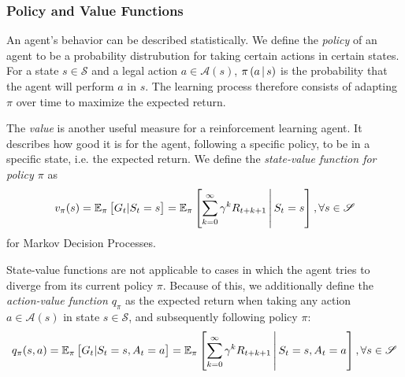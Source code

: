 \subsubsection{Policy and Value Functions}
An agent's behavior can be described statistically. We define the \textit{policy} of an agent to be a probability distrubution for taking certain actions in certain states. For a state $s \in \mathscr{S}$ and a legal action $a \in \mathscr{A}(s)$, $\pi\left(a \,\middle|\, s\right)$ is the probability that the agent will perform $a$ in $s$. The learning process therefore consists of adapting $\pi$ over time to maximize the expected return. \cite{bible}

The \textit{value} is another useful measure for a reinforcement learning agent. It describes how good it is for the agent, following a specific policy, to be in a specific state, i.e. the expected return. We define the \textit{state-value function for policy $\pi$} as
\begin{equation*}
    v_\pi(s) = \mathbb{E}_\pi\left[G_t | S_t = s\right]
             = \mathbb{E}_\pi\left[\sum_{k=0}^\infty \gamma^k R_{t+k+1} \,\middle|\, S_t = s\right], \forall s \in \mathscr{S}
\end{equation*}
for Markov Decision Processes. \cite{bible}

State-value functions are not applicable to cases in which the agent tries to diverge from its current policy $\pi$. Because of this, we additionally define the \textit{action-value function $q_\pi$} as the expected return when taking any action $a \in \mathscr{A}(s)$ in state $s \in \mathscr{S}$, and subsequently following policy $\pi$: \cite{bible}
\begin{equation*}
    q_\pi(s, a) = \mathbb{E}_\pi\left[G_t | S_t = s, A_t = a\right]
             = \mathbb{E}_\pi\left[\sum_{k=0}^\infty \gamma^k R_{t+k+1} \,\middle|\, S_t = s, A_t = a\right], \forall s \in \mathscr{S}
\end{equation*}